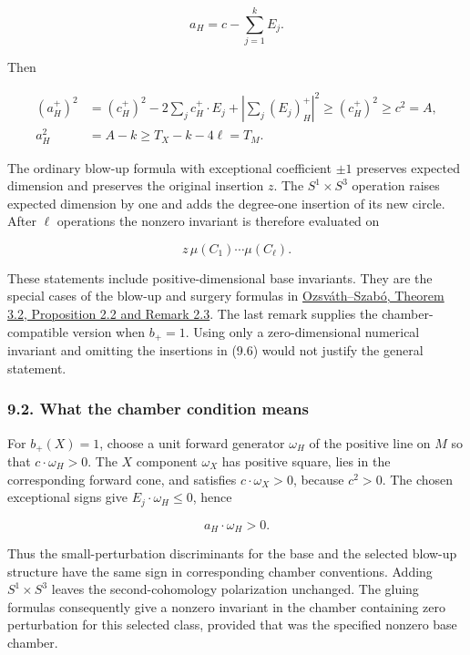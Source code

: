 \documentclass[
  10pt,
]{article}
\begin{document}
\[
                             a_H=c-\sum_{j=1}^kE_j.
 \tag{9.4}
\]

Then

\[
 \begin{aligned}
 (a_H^+)^2
   &=(c_H^+)^2-2\sum_jc_H^+\mathbin\cdot E_j
                              +\left|\sum_j(E_j)_H^+\right|^2
      \ge(c_H^+)^2\ge c^2=A,\\
 a_H^2&=A-k\ge T_X-k-4\ell=T_M.
 \end{aligned}                                              \tag{9.5}
\]

The ordinary blow-up formula with exceptional coefficient \(\pm1\)
preserves expected dimension and preserves the original insertion \(z\).
The \(S^1\times S^3\) operation raises expected dimension by one and
adds the degree-one insertion of its new circle. After \(\ell\)
operations the nonzero invariant is therefore evaluated on

\[
                           z\,\mu(C_1)\cdots\mu(C_\ell).
 \tag{9.6}
\]

These statements include positive-dimensional base invariants. They are
the special cases of the blow-up and surgery formulas in
\href{https://arxiv.org/pdf/math/0005268}{Ozsváth--Szabó, Theorem 3.2,
Proposition 2.2 and Remark 2.3}. The last remark supplies the
chamber-compatible version when \(b_+=1\). Using only a zero-dimensional
numerical invariant and omitting the insertions in (9.6) would not
justify the general statement.

\hypertarget{what-the-chamber-condition-means}{%
\subsubsection{9.2. What the chamber condition
means}\label{what-the-chamber-condition-means}}

For \(b_+(X)=1\), choose a unit forward generator \(\omega_H\) of the
positive line on \(M\) so that \(c\cdot\omega_H>0\). The \(X\) component
\(\omega_X\) has positive square, lies in the corresponding forward
cone, and satisfies \(c\cdot\omega_X>0\), because \(c^2>0\). The chosen
exceptional signs give \(E_j\cdot\omega_H\le0\), hence

\[
                          a_H\cdot\omega_H>0.             \tag{9.7}
\]

Thus the small-perturbation discriminants for the base and the selected
blow-up structure have the same sign in corresponding chamber
conventions. Adding \(S^1\times S^3\) leaves the second-cohomology
polarization unchanged. The gluing formulas consequently give a nonzero
invariant in the chamber containing zero perturbation for this selected
class, provided that was the specified nonzero base chamber.
\end{document}
